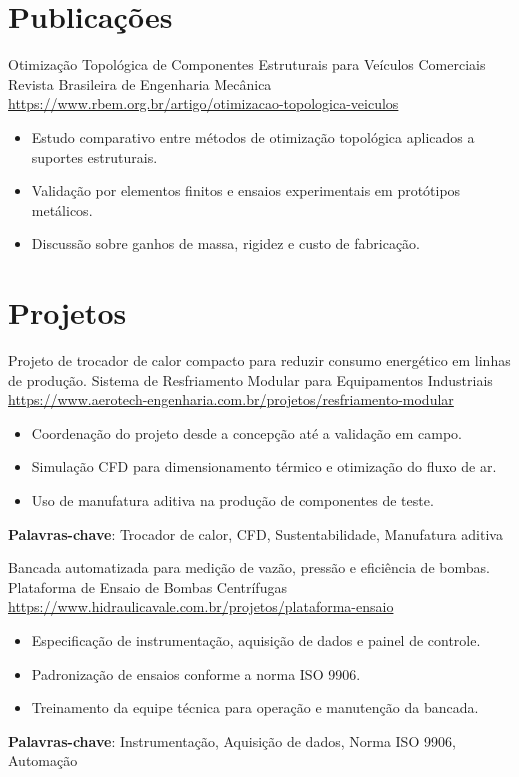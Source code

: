 \documentclass[a4paper, serif, 10pt]{moderncv}
\begin{document}
\section{Publicações}

        {Otimização Topológica de Componentes Estruturais para Veículos Comerciais}
        {Revista Brasileira de Engenharia Mecânica}
        {\url{https://www.rbem.org.br/artigo/otimizacao-topologica-veiculos}}
        {}
        {\begin{itemize}
\item Estudo comparativo entre métodos de otimização topológica aplicados a suportes estruturais.
\item Validação por elementos finitos e ensaios experimentais em protótipos metálicos.
\item Discussão sobre ganhos de massa, rigidez e custo de fabricação.
\end{itemize}}
\section{Projetos}

        {Projeto de trocador de calor compacto para reduzir consumo energético em linhas de produção.}
        {Sistema de Resfriamento Modular para Equipamentos Industriais}
        {\url{https://www.aerotech-engenharia.com.br/projetos/resfriamento-modular}}
        {}
        {\begin{itemize}
\item Coordenação do projeto desde a concepção até a validação em campo.
\item Simulação CFD para dimensionamento térmico e otimização do fluxo de ar.
\item Uso de manufatura aditiva na produção de componentes de teste.
\end{itemize}
\textbf{Palavras-chave}: Trocador de calor, CFD, Sustentabilidade, Manufatura aditiva}

        {Bancada automatizada para medição de vazão, pressão e eficiência de bombas.}
        {Plataforma de Ensaio de Bombas Centrífugas}
        {\url{https://www.hidraulicavale.com.br/projetos/plataforma-ensaio}}
        {}
        {\begin{itemize}
\item Especificação de instrumentação, aquisição de dados e painel de controle.
\item Padronização de ensaios conforme a norma ISO 9906.
\item Treinamento da equipe técnica para operação e manutenção da bancada.
\end{itemize}
\textbf{Palavras-chave}: Instrumentação, Aquisição de dados, Norma ISO 9906, Automação}
\end{document}
